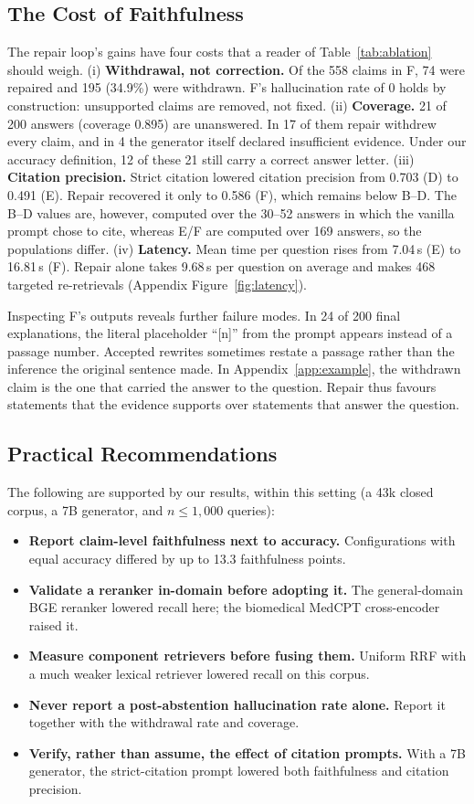 \documentclass[11pt]{article}
\begin{document}
\subsection{The Cost of Faithfulness}\label{sec:cost}
The repair loop's gains have four costs that a reader of Table~\ref{tab:ablation} should weigh.
(i) \textbf{Withdrawal, not correction.} Of the 558 claims in F, 74 were repaired and 195 (34.9\%) were withdrawn. F's hallucination rate of 0 holds by construction: unsupported claims are removed, not fixed. %
(ii) \textbf{Coverage.} 21 of 200 answers (coverage 0.895) are unanswered. In 17 of them repair withdrew every claim, and in 4 the generator itself declared insufficient evidence. Under our accuracy definition, 12 of these 21 still carry a correct answer letter. %
(iii) \textbf{Citation precision.} Strict citation lowered citation precision from 0.703 (D) to 0.491 (E). Repair recovered it only to 0.586 (F), which remains below B--D. The B--D values are, however, computed over the 30--52 answers in which the vanilla prompt chose to cite, whereas E/F are computed over 169 answers, so the populations differ. %
(iv) \textbf{Latency.} Mean time per question rises from 7.04\,s (E) to 16.81\,s (F). Repair alone takes 9.68\,s per question on average and makes 468 targeted re-retrievals (Appendix Figure~\ref{fig:latency}). %

Inspecting F's outputs reveals further failure modes. In 24 of 200 final explanations, the literal placeholder ``[n]'' from the prompt appears instead of a passage number. Accepted rewrites sometimes restate a passage rather than the inference the original sentence made. In Appendix~\ref{app:example}, the withdrawn claim is the one that carried the answer to the question. %
Repair thus favours statements that the evidence supports over statements that answer the question.

\subsection{Practical Recommendations}
The following are supported by our results, within this setting (a 43k closed corpus, a 7B generator, and $n\le1{,}000$ queries):
\begin{itemize}
\item \textbf{Report claim-level faithfulness next to accuracy.} Configurations with equal accuracy differed by up to 13.3 faithfulness points.
\item \textbf{Validate a reranker in-domain before adopting it.} The general-domain BGE reranker lowered recall here; the biomedical MedCPT cross-encoder raised it.
\item \textbf{Measure component retrievers before fusing them.} Uniform RRF with a much weaker lexical retriever lowered recall on this corpus.
\item \textbf{Never report a post-abstention hallucination rate alone.} Report it together with the withdrawal rate and coverage.
\item \textbf{Verify, rather than assume, the effect of citation prompts.} With a 7B generator, the strict-citation prompt lowered both faithfulness and citation precision.
\end{itemize}
\end{document}
